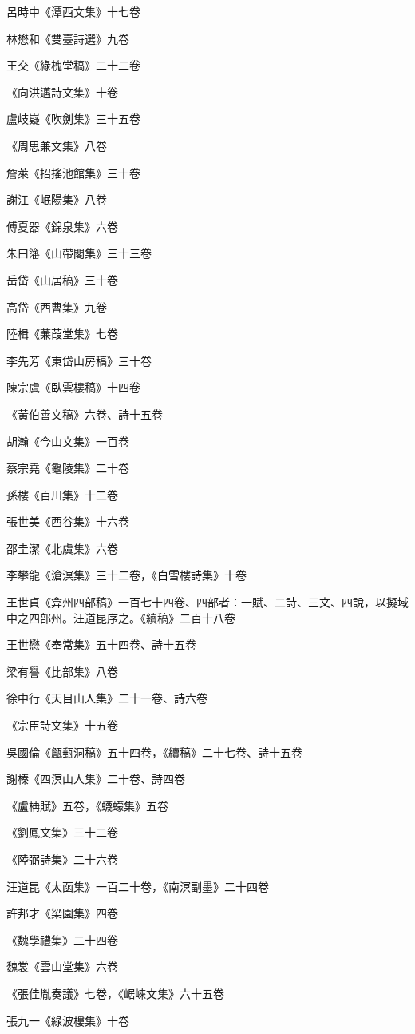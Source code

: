 呂時中《潭西文集》十七卷

林懋和《雙臺詩選》九卷

王交《綠槐堂稿》二十二卷

《向洪邁詩文集》十卷

盧岐嶷《吹劍集》三十五卷

《周思兼文集》八卷

詹萊《招搖池館集》三十卷

謝江《岷陽集》八卷

傅夏器《錦泉集》六卷

朱曰籓《山帶閣集》三十三卷

岳岱《山居稿》三十卷

高岱《西曹集》九卷

陸楫《蒹葭堂集》七卷

李先芳《東岱山房稿》三十卷

陳宗虞《臥雲樓稿》十四卷

《黃伯善文稿》六卷、詩十五卷

胡瀚《今山文集》一百卷

蔡宗堯《龜陵集》二十卷

孫樓《百川集》十二卷

張世美《西谷集》十六卷

邵圭潔《北虞集》六卷

李攀龍《滄溟集》三十二卷，《白雪樓詩集》十卷

王世貞《弇州四部稿》一百七十四卷、四部者：一賦、二詩、三文、四說，以擬域中之四部州。汪道昆序之。《續稿》二百十八卷

王世懋《奉常集》五十四卷、詩十五卷

梁有譽《比部集》八卷

徐中行《天目山人集》二十一卷、詩六卷

《宗臣詩文集》十五卷

吳國倫《甔甀洞稿》五十四卷，《續稿》二十七卷、詩十五卷

謝榛《四溟山人集》二十卷、詩四卷

《盧柟賦》五卷，《蠛蠓集》五卷

《劉鳳文集》三十二卷

《陸弼詩集》二十六卷

汪道昆《太函集》一百二十卷，《南溟副墨》二十四卷

許邦才《梁園集》四卷

《魏學禮集》二十四卷

魏裳《雲山堂集》六卷

《張佳胤奏議》七卷，《崌崍文集》六十五卷

張九一《綠波樓集》十卷

